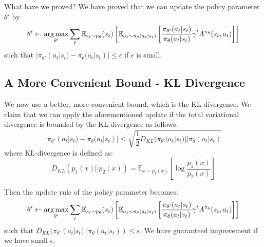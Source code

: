 What have we proved? We have proved that we can update the policy parameter $\theta'$ by
$$\theta' \leftarrow \operatorname*{arg\,max}_{\theta'} \sum_t \mathbb{E}_{s_t\sim p_{\theta}}(s_t)\left[\mathbb{E}_{a_t\sim \pi_\theta(a_t|s_t)}\left[\frac{\pi_{\theta'}(a_t|s_t)}{\pi_\theta(a_t|s_t)}\gamma^t A^{\pi_\theta}(s_t,a_t)\right]\right]$$
such that $|\pi_{\theta'}(a_t|s_t) - \pi_{\theta}(a_t|s_t)|\leq \epsilon$ if $\epsilon$ is small.

\subsection{A More Convenient Bound - KL Divergence}
We now use a better, more convenient bound, which is the KL-divergence. We claim that we can apply the aforementioned update if the total variational divergence is bounded by the KL-divergence as follows:
$$|\pi_{\theta'}(a_t|s_t) - \pi_{\theta}(a_t|s_t)|\leq \sqrt{\frac{1}{2}D_{KL}(\pi_{\theta'}(a_t|s_t)||\pi_{\theta}(a_t|s_t)}$$
where KL-divergence is defined as:
$$D_{KL}(p_1(x)||p_2(x)) = \mathbb{E}_{x\sim p_1(x)}\left[\log\frac{p_1(x)}{p_2(x)}\right]$$

Then the update rule of the policy parameter becomes:
$$\theta' \leftarrow \operatorname*{arg\,max}_{\theta'} \sum_t \mathbb{E}_{s_t\sim p_{\theta}}(s_t)\left[\mathbb{E}_{a_t\sim \pi_\theta(a_t|s_t)}\left[\frac{\pi_{\theta'}(a_t|s_t)}{\pi_\theta(a_t|s_t)}\gamma^t A^{\pi_\theta}(s_t,a_t)\right]\right]$$
such that $D_{KL}(\pi_{\theta'}(a_t|s_t)||\pi_{\theta}(a_t|s_t))\leq \epsilon$. We have guaranteed improvement if we have small $\epsilon$.

